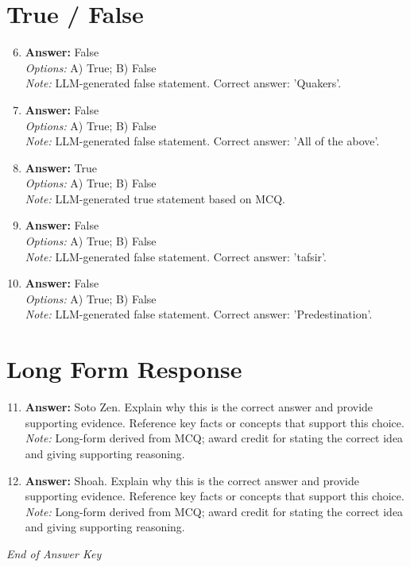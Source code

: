 \documentclass[12pt]{article}
\begin{document}
\section*{True / False}
\begin{enumerate}[label=\arabic*.]
\setcounter{enumi}{5}
\item \textbf{Answer:} False
\\ \textit{Options:} A) True; B) False
\\ \textit{Note:} LLM-generated false statement. Correct answer: 'Quakers'.
\item \textbf{Answer:} False
\\ \textit{Options:} A) True; B) False
\\ \textit{Note:} LLM-generated false statement. Correct answer: 'All of the above'.
\item \textbf{Answer:} True
\\ \textit{Options:} A) True; B) False
\\ \textit{Note:} LLM-generated true statement based on MCQ.
\item \textbf{Answer:} False
\\ \textit{Options:} A) True; B) False
\\ \textit{Note:} LLM-generated false statement. Correct answer: 'tafsir'.
\item \textbf{Answer:} False
\\ \textit{Options:} A) True; B) False
\\ \textit{Note:} LLM-generated false statement. Correct answer: 'Predestination'.
\end{enumerate}

\section*{Long Form Response}
\begin{enumerate}[label=\arabic*.]
\setcounter{enumi}{10}
\item \textbf{Answer:} Soto Zen. Explain why this is the correct answer and provide supporting evidence. Reference key facts or concepts that support this choice.
\\ \textit{Note:} Long-form derived from MCQ; award credit for stating the correct idea and giving supporting reasoning.
\item \textbf{Answer:} Shoah. Explain why this is the correct answer and provide supporting evidence. Reference key facts or concepts that support this choice.
\\ \textit{Note:} Long-form derived from MCQ; award credit for stating the correct idea and giving supporting reasoning.
\end{enumerate}

\vfill
\noindent\textit{End of Answer Key}
\end{document}
